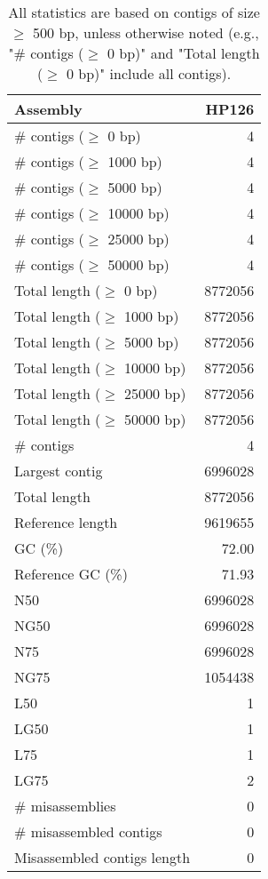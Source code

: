 \documentclass[12pt,a4paper]{article}
\begin{document}
\begin{table}[ht]
\begin{center}
\caption{All statistics are based on contigs of size $\geq$ 500 bp, unless otherwise noted (e.g., "\# contigs ($\geq$ 0 bp)" and "Total length ($\geq$ 0 bp)" include all contigs).}
\begin{tabular}{|l*{1}{|r}|}
\hline
Assembly & HP126 \\ \hline
\# contigs ($\geq$ 0 bp) & 4 \\ \hline
\# contigs ($\geq$ 1000 bp) & 4 \\ \hline
\# contigs ($\geq$ 5000 bp) & 4 \\ \hline
\# contigs ($\geq$ 10000 bp) & 4 \\ \hline
\# contigs ($\geq$ 25000 bp) & 4 \\ \hline
\# contigs ($\geq$ 50000 bp) & 4 \\ \hline
Total length ($\geq$ 0 bp) & 8772056 \\ \hline
Total length ($\geq$ 1000 bp) & 8772056 \\ \hline
Total length ($\geq$ 5000 bp) & 8772056 \\ \hline
Total length ($\geq$ 10000 bp) & 8772056 \\ \hline
Total length ($\geq$ 25000 bp) & 8772056 \\ \hline
Total length ($\geq$ 50000 bp) & 8772056 \\ \hline
\# contigs & 4 \\ \hline
Largest contig & 6996028 \\ \hline
Total length & 8772056 \\ \hline
Reference length & 9619655 \\ \hline
GC (\%) & 72.00 \\ \hline
Reference GC (\%) & 71.93 \\ \hline
N50 & 6996028 \\ \hline
NG50 & 6996028 \\ \hline
N75 & 6996028 \\ \hline
NG75 & 1054438 \\ \hline
L50 & 1 \\ \hline
LG50 & 1 \\ \hline
L75 & 1 \\ \hline
LG75 & 2 \\ \hline
\# misassemblies & 0 \\ \hline
\# misassembled contigs & 0 \\ \hline
Misassembled contigs length & 0 \\ \hline

\end{tabular}
\end{center}
\end{table}
\end{document}
